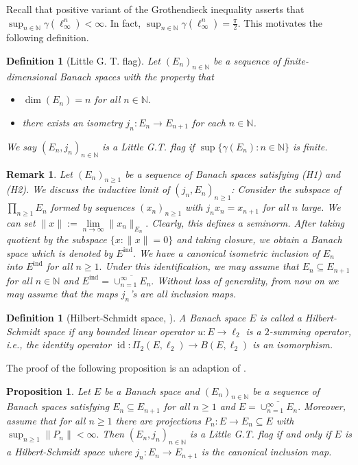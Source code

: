 \documentclass[a4paper,oneside,11pt, reqno]{amsart}
\numberwithin{equation}{section}
\newtheorem{proposition}[theorem]{Proposition}
\newtheorem{definition}[theorem]{Definition}
\newtheorem{remark}[theorem]{Remark}
\theoremstyle{plain}
\begin{document}
Recall that positive  variant of the Grothendieck inequality asserts that $\sup_{n\in\mathbb N}\gamma(\ell_\infty^n)<\infty.$ In fact, $\sup_{n\in\mathbb N}\gamma(\ell_\infty^n)=\frac{\pi}{2}.$ This motivates the following definition.
\begin{definition}[Little G. T. flag]
Let $(E_n)_{n\in\mathbb N}$ be a sequence of finite-dimensional Banach spaces with the property that
\begin{itemize}
    \item[H1:] $\dim(E_n)=n$ for all $n\in\mathbb N.$ 
    \item[H2:] there exists an isometry $j_n:E_n\to E_{n+1}$ for each $n\in\mathbb N$. 
\end{itemize}
We say $(E_n,j_n)_{n\in\mathbb N}$ is a Little G.T. flag if %
$\sup\{\gamma(E_n): n\in\mathbb N\}$ is finite.
\end{definition}
\begin{remark}\label{normalin}
Let $(E_n)_{n\geqslant 1}$ be a sequence of Banach spaces 
satisfying (H1) and (H2).
We discuss the inductive limit of $(j_n,E_n)_{n\geqslant 1}$: Consider the subspace of $\prod_{n\geqslant 1}E_n$ formed by sequences $(x_n)_{n\geqslant 1}$ with $j_nx_n=x_{n+1}$ for all $n$ large. We can set $\|x\|:=\lim\limits_{n\to\infty}\|x_n\|_{E_n}.$ 
Clearly, this defines a seminorm. After taking quotient by the subspace  $\{x:\|x\|=0\}$ and taking closure, we obtain a Banach space which is denoted by $E^{\text{ind}}.$ We have a canonical isometric inclusion of $E_n$ into $E^{\text{ind}}$ for all $n\geqslant 1.$ Under this identification, we may assume that $E_n\subseteq E_{n+1}$ for all $n\in\mathbb N$ and $E^{\text{ind}}=\overline{\cup_{n=1}^\infty E_n}.$ Without loss of generality, from now on we may assume that the maps $j_n$'s are all inclusion maps. 
\end{remark}
\begin{definition}[Hilbert-Schmidt space, \cite{Jarchow82}]
A Banach space $E$ is called a Hilbert-Schmidt space if any bounded linear operator $u:E\to\ell_2$ is a $2$-summing operator, i.e., the identity operator $\operatorname{id}:\Pi_2(E,\ell_2)\to B(E,\ell_2)$ is an isomorphism.
\end{definition}
The proof of the following proposition is an adaption of \cite[Fact 2]{BM}.
\begin{proposition} \label{prop:5.5}
Let $E$ be a Banach space and $(E_n)_{n\in\mathbb{N}}$ be a sequence of Banach spaces satisfying $E_n\subseteq E_{n+1}$ for all $n\geq 1$ and $E=\overline{\cup_{n=1}^\infty E_n}.$ Moreover, assume that for all $n\geq 1$ there are projections $P_n:E\to E_n\subseteq E$ with $\sup_{n\geq 1}\|P_n\|<\infty.$ Then  $(E_n,j_n)_{n\in\mathbb N}$ is a Little G.T. flag if and only if $E$ is a Hilbert-Schmidt space where $j_n:E_n\to E_{n+1}$ is the canonical inclusion map.
\end{proposition}
\end{document}
